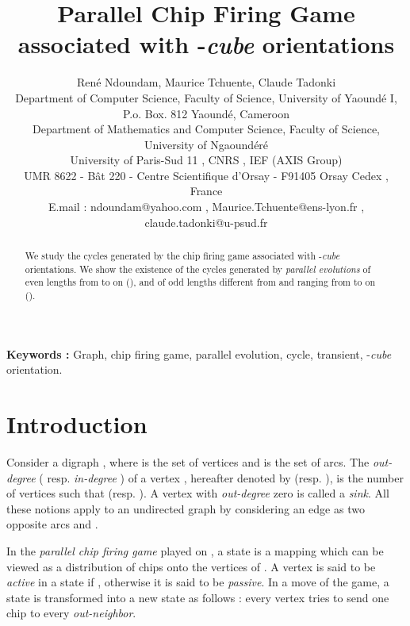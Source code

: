 \documentclass{article}
\begin{document}
\title{\bf Parallel Chip Firing Game associated with -{\em cube} orientations}  
\author{Ren\'e Ndoundam, Maurice Tchuente, Claude Tadonki \\
 {\small Department of Computer Science, Faculty of Science, 
 University of Yaound\'e I,  } \\
{\small P.o. Box. 812 Yaound\'e, Cameroon} \\
 {\small Department of Mathematics and Computer Science, Faculty of Science, University of Ngaound\'er\'e } \\
{\small University of Paris-Sud 11 ,  CNRS , IEF (AXIS Group) } \\
        {\small UMR 8622 - B\^at 220 - Centre Scientifique d'Orsay - F91405 Orsay Cedex , France}    \\
{\small E.mail : ndoundam@yahoo.com , Maurice.Tchuente@ens-lyon.fr , claude.tadonki@u-psud.fr } \\
                 } 
\maketitle
\begin{abstract} We study the cycles generated by the chip firing game
 associated with -{\em cube} orientations. We show the existence of the cycles generated by
{\em parallel evolutions} of even lengths from  to  on  (), and of odd lengths different
 from  and ranging from  to  on  ().
\end{abstract}
{\bf Keywords :}
Graph, chip firing game, parallel evolution, cycle, transient, -{\em cube} orientation.

\pagestyle{myheadings}
\thispagestyle{plain}

\section{Introduction}
Consider a digraph , where  is the set of vertices
and  is the set of arcs. The {\em out-degree} ( resp. {\em in-degree} ) of a
vertex , hereafter denoted by  (resp.  ), is the number of vertices  such
that  (resp. ). A vertex
with {\em out-degree} zero is called a {\em sink}. All these notions apply to an
undirected graph  by considering an edge  as two opposite
arcs  and .

In the {\em parallel chip firing game} played on , a state is a mapping
 which can be viewed as a distribution of chips onto the
vertices of . A vertex is said to be {\em active} in a state  if
, otherwise it is said to be {\em passive}. In a move of the
game, a state  is transformed into a new state as follows : every vertex
tries to send one chip to every {\em out-neighbor}.
\end{document}
